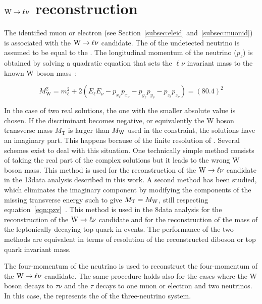 \section{$\mathrm{W}\to\ell\nu$ reconstruction}\label{sec:leptonicW}

The identified muon or electron (see Section~\ref{subsec:eleid} and~\ref{subsec:muonid}) is associated with the $\mathrm{W}\to\ell\nu$ candidate. 
The \Vpt of the undetected neutrino is assumed to be equal to the \ptvecmiss. The longitudinal momentum of the neutrino ($p_z$) is obtained by solving a quadratic equation that sets the $\ell\nu$ invariant
mass to the known W boson mass~\cite{Olive:2016xmw}:

\begin{equation}\label{eqn:pzv}
M_\mathrm{W}^2 = m_\ell^2   + 2(E_\ell E_\nu - p_{x_\ell}p_{x_\nu} - p_{y_\ell}p_{y_\nu} - p_{z_\ell}p_{z_\nu} ) = (80.4)^2
\end{equation}

In the case of two real solutions, the one with the smaller absolute value is chosen.
If the discriminant becomes negative, or equivalently the W boson transverse mass $M_\mathrm{T}$ is larger than $M_\mathrm{W}$ used in the constraint, the solutions have an imaginary part. This happens because of the finite resolution of \ETmiss.
Several schemes exist to deal with this situation. One technically simple method consists of taking the real part of the complex solutions but it leads to the wrong W boson mass. This method is used for the reconstruction of the $\mathrm{W}\to\ell\nu$ candidate in the 13\TeV data analysis described in this work.
A second method has been studied, which eliminates the imaginary component by modifying the components of the missing transverse energy such to give $M_\mathrm{T} =  M_\mathrm{W}$, still respecting equation~\ref{eqn:pzv}~\cite{BauerPhd10}. This method is used in the 8\TeV data analysis for the reconstruction of the $\mathrm{W}\to\ell\nu$ candidate and for the reconstruction of the mass of the leptonically decaying top quark in \ttbar events. The performance of the two methods are equivalent in terms of resolution of the reconstructed diboson or top quark invariant mass.

The four-momentum of the neutrino is used to reconstruct the four-momentum of the $\mathrm{W}\to\ell\nu$ candidate.
The same procedure holds also for the cases where the W boson decays to $\tau\nu$ and the $\tau$ decays to one muon or electron and two neutrinos.
In this case, the \ptvecmiss represents the \Vpt of the three-neutrino system.